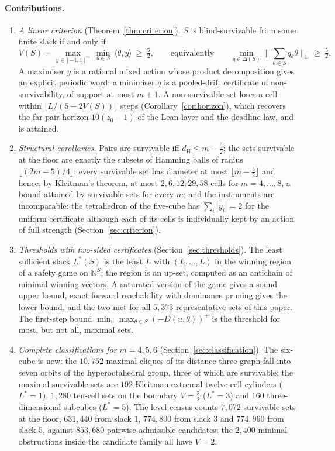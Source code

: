\documentclass[11pt,a4paper]{article}
\theoremstyle{plain}
\theoremstyle{definition}
\theoremstyle{remark}
\newcommand{\N}{\mathbb{N}}
\newcommand{\dH}{d_{\mathrm{H}}}
\newcommand{\tfr}[2]{\tfrac{#1}{#2}}
\newcommand{\Lstar}{L^{\ast}}
\begin{document}
\paragraph{Contributions.}
\begin{enumerate}[leftmargin=2em,itemsep=1pt]
\item \emph{A linear criterion} (Theorem~\ref{thm:criterion}). $S$ is blind-survivable from some finite slack if and only if
\[V(S)=\max_{y\in[-1,1]^m}\ \min_{\theta\in S}\ \langle\theta,y\rangle\ \ge\ \tfr52,\qquad\text{equivalently}\qquad \min_{q\in\Delta(S)}\Big\|\sum_{\theta\in S}q_\theta\theta\Big\|_1\ \ge\ \tfr52 .\]
A maximiser $y$ is a rational mixed action whose product decomposition gives an explicit periodic word; a minimiser $q$ is a pooled-drift certificate of non-survivability, of support at most $m+1$. A non-survivable set loses a cell within $\lfloor L/(5-2V(S))\rfloor$ steps (Corollary~\ref{cor:horizon}), which recovers the far-pair horizon $10(z_0-1)$ of the Lean layer and the deadline law, and is attained.
\item \emph{Structural corollaries.} Pairs are survivable iff $\dH\le m-\tfr52$; the sets survivable at the floor are exactly the subsets of Hamming balls of radius $\lfloor(2m-5)/4\rfloor$; every survivable set has diameter at most $\lfloor m-\tfr52\rfloor$ and hence, by Kleitman's theorem, at most $2,6,12,29,58$ cells for $m=4,\dots,8$, a bound attained by survivable sets for every $m$; and the instruments are incomparable: the tetrahedron of the five-cube has $\sum_i|y_i|=2$ for the uniform certificate although each of its cells is individually kept by an action of full strength (Section~\ref{sec:criterion}).
\item \emph{Thresholds with two-sided certificates} (Section~\ref{sec:thresholds}). The least sufficient slack $\Lstar(S)$ is the least $L$ with $(L,\dots,L)$ in the winning region of a safety game on $\N^S$; the region is an up-set, computed as an antichain of minimal winning vectors. A saturated version of the game gives a sound upper bound, exact forward reachability with dominance pruning gives the lower bound, and the two met for all $5{,}373$ representative sets of this paper. The first-step bound $\min_u\max_{\theta\in S}(-D(u,\theta))^+$ is the threshold for most, but not all, maximal sets.
\item \emph{Complete classifications for $m=4,5,6$} (Section~\ref{sec:classification}). The six-cube is new: the $10{,}752$ maximal cliques of its distance-three graph fall into seven orbits of the hyperoctahedral group, three of which are survivable; the maximal survivable sets are $192$ Kleitman-extremal twelve-cell cylinders ($\Lstar=1$), $1{,}280$ ten-cell sets on the boundary $V=\tfr52$ ($\Lstar=3$) and $160$ three-dimensional subcubes ($\Lstar=5$). The level census counts $7{,}072$ survivable sets at the floor, $631{,}440$ from slack $1$, $774{,}800$ from slack $3$ and $774{,}960$ from slack $5$, against $853{,}680$ pairwise-admissible candidates; the $2{,}400$ minimal obstructions inside the candidate family all have $V=2$.

\end{enumerate}
\end{document}
